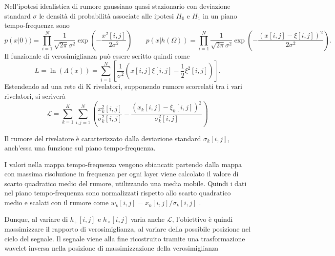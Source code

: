 Nell'ipotesi idealistica di rumore gaussiano quasi stazionario con deviazione standard $\sigma$ le densità di probabilità associate alle ipotesi $H_0$ e $H_1$ in un piano tempo-frequenza sono 
\begin{equation}
	p(x|0)) = \prod_{i=1}^N\frac{1}{\sqrt{2\pi}\sigma^2}\exp(-\frac{x^2[i,j]}{2\sigma^2})
	\quad\quad
	p(x|h(\Omega)) = \prod_{i=1}^N\frac{1}{\sqrt{2\pi}\sigma^2}\exp(-\frac{(x[i,j]-\xi[i,j])^2}{2\sigma^2}).
\end{equation}
Il funzionale di verosimiglianza può essere scritto quindi come
\begin{equation}
	L = \ln(\Lambda(x)) = \sum_{i=1}^{N}\left[\frac{1}{\sigma^2}\left(x[i,j]\xi[i,j]-\frac{1}{2}\xi^2[i,j]\right)\right].
\end{equation}
Estendendo ad una rete di K rivelatori, supponendo rumore scorrelati tra i vari rivelatori, si scriverà
\begin{equation}
	\mathcal{L} = \sum_{k=1}^{K}\sum_{i,j=1}^{N}\left(\frac{x_k^2[i,j]}{\sigma_k^2[i,j]} - \frac{(x_k[i,j]-\xi_k[i,j])^2}{\sigma_k^2[i,j]}  \right)
	\label{eqn:Likelihood}
\end{equation}

Il rumore del rivelatore è caratterizzato dalla deviazione standard $\sigma_k[i,j]$,  anch'essa una funzione sul piano tempo-frequenza. 

I valori nella mappa tempo-frequenza vengono sbiancati: partendo dalla mappa con massima risoluzione in frequenza per ogni layer viene calcolato il valore di scarto quadratico medio del rumore, utilizzando una media mobile. Quindi i dati nel piano tempo-frequenza sono normalizzati rispetto allo scarto quadratico medio e scalati con il rumore come $w_k[i,j] = x_k[i,j]/\sigma_k[i,j]$ .

Dunque, al variare di $h_{+}[i,j]$ e $h_{\times}[i,j]$ varia anche $\mathcal{L}$, l'obiettivo è quindi massimizzare il rapporto di verosimiglianza, al variare della possibile posizione nel cielo del segnale. Il segnale viene alla fine ricostruito tramite una trasformazione wavelet inversa nella posizione di massimizzazione della verosimiglianza

